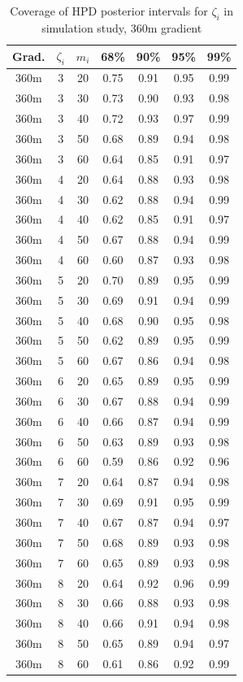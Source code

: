 \begin{table}
\begin{center}
\caption{Coverage of HPD posterior intervals for $\zeta_i$ in simulation study, 360m gradient
\label{supp:proteomics:tab:sim_coverage_360m}}
\begin{tabular}{ccc|cccc}
 Grad. & $\zeta_i$ & $m_i$ & 68\% & 90\% & 95\% & 99\% \\ 
 \hline
360m &   3 &  20 & 0.75 & 0.91 & 0.95 & 0.99 \\ 
  360m &   3 &  30 & 0.73 & 0.90 & 0.93 & 0.98 \\ 
  360m &   3 &  40 & 0.72 & 0.93 & 0.97 & 0.99 \\ 
  360m &   3 &  50 & 0.68 & 0.89 & 0.94 & 0.98 \\ 
  360m &   3 &  60 & 0.64 & 0.85 & 0.91 & 0.97 \\ 
   \hline
360m &   4 &  20 & 0.64 & 0.88 & 0.93 & 0.98 \\ 
  360m &   4 &  30 & 0.62 & 0.88 & 0.94 & 0.99 \\ 
  360m &   4 &  40 & 0.62 & 0.85 & 0.91 & 0.97 \\ 
  360m &   4 &  50 & 0.67 & 0.88 & 0.94 & 0.99 \\ 
  360m &   4 &  60 & 0.60 & 0.87 & 0.93 & 0.98 \\ 
   \hline
360m &   5 &  20 & 0.70 & 0.89 & 0.95 & 0.99 \\ 
  360m &   5 &  30 & 0.69 & 0.91 & 0.94 & 0.99 \\ 
  360m &   5 &  40 & 0.68 & 0.90 & 0.95 & 0.98 \\ 
  360m &   5 &  50 & 0.62 & 0.89 & 0.95 & 0.99 \\ 
  360m &   5 &  60 & 0.67 & 0.86 & 0.94 & 0.98 \\ 
   \hline
360m &   6 &  20 & 0.65 & 0.89 & 0.95 & 0.99 \\ 
  360m &   6 &  30 & 0.67 & 0.88 & 0.94 & 0.99 \\ 
  360m &   6 &  40 & 0.66 & 0.87 & 0.94 & 0.99 \\ 
  360m &   6 &  50 & 0.63 & 0.89 & 0.93 & 0.98 \\ 
  360m &   6 &  60 & 0.59 & 0.86 & 0.92 & 0.96 \\ 
   \hline
360m &   7 &  20 & 0.64 & 0.87 & 0.94 & 0.98 \\ 
  360m &   7 &  30 & 0.69 & 0.91 & 0.95 & 0.99 \\ 
  360m &   7 &  40 & 0.67 & 0.87 & 0.94 & 0.97 \\ 
  360m &   7 &  50 & 0.68 & 0.89 & 0.93 & 0.98 \\ 
  360m &   7 &  60 & 0.65 & 0.89 & 0.93 & 0.98 \\ 
   \hline
360m &   8 &  20 & 0.64 & 0.92 & 0.96 & 0.99 \\ 
  360m &   8 &  30 & 0.66 & 0.88 & 0.93 & 0.98 \\ 
  360m &   8 &  40 & 0.66 & 0.91 & 0.94 & 0.98 \\ 
  360m &   8 &  50 & 0.65 & 0.89 & 0.94 & 0.97 \\ 
  360m &   8 &  60 & 0.61 & 0.86 & 0.92 & 0.99 \\ 
   \hline
\end{tabular}
\end{center}
\end{table}
